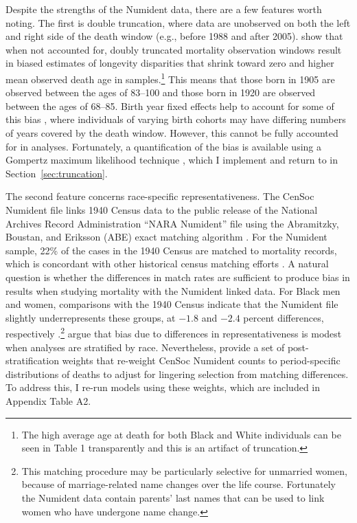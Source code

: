 \documentclass[11pt]{article}
\begin{document}
Despite the strengths of the Numident data, there are a few features worth noting. The first is double truncation, where data are unobserved on both the left and right side of the death window (e.g., before 1988 and after 2005).
\citet{goldstein_mortality_2023} show that when not accounted for, doubly truncated mortality observation windows result in biased estimates of longevity disparities that shrink toward zero and higher mean observed death age in samples.\footnote{The high average age at death for both Black and White individuals can be seen in Table 1 transparently and this is an artifact of truncation.}
This means that those born in 1905 are observed between the ages of 83--100 and those born in 1920 are observed between the ages of 68--85.
Birth year fixed effects help to account for some of this bias \citep{goldstein_mortality_2023}, where individuals of varying birth cohorts may have differing numbers of years covered by the death window. However, this cannot be fully accounted for in analyses. Fortunately, a quantification of the bias is available using a Gompertz maximum likelihood technique \citep{goldstein_mortality_2023,breen_longevity_2024}, which I implement and return to in Section~\ref{sec:truncation}.

The second feature concerns race-specific representativeness. The CenSoc Numident file links 1940 Census data to the public release of the National Archives Record Administration ``NARA Numident'' file using the Abramitzky, Boustan, and Eriksson (ABE) exact matching algorithm \citep{abramitzky_europes_2012}. For the Numident sample, 22\% of the cases in the 1940 Census are matched to mortality records, which is concordant with other historical census matching efforts \citep[p.~7]{breen_censoc_2023}. A natural question is whether the differences in match rates are sufficient to produce bias in results when studying mortality with the Numident linked data. For Black men and women, comparisons with the 1940 Census indicate that the Numident file slightly underrepresents these groups, at $-1.8$ and $-2.4$ percent differences, respectively \citep{breen_censoc_2023}.\footnote{This matching procedure may be particularly selective for unmarried women, because of marriage-related name changes over the life course. Fortunately the Numident data contain parents' last names that can be used to link women who have undergone name change.} \citet{breen_censoc_2023} argue that bias due to differences in representativeness is modest when analyses are stratified by race. Nevertheless, \citet{osborne_censoc-numident_nodate} provide a set of post-stratification weights that re-weight CenSoc Numident counts to period-specific distributions of deaths to adjust for lingering selection from matching differences. To address this, I re-run models using these weights, which are included in Appendix Table A2.
\end{document}
